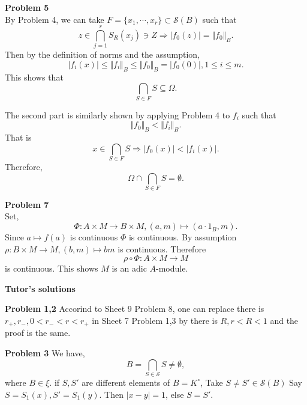 \documentclass[10pt]{article}
\newcommand{\norm}[1]{\Vert #1 \Vert}
\newcommand{\ab}[1]{\vert #1 \vert}
\begin{document}
\par\textbf{Problem 5}\\
By Problem 4, we can take $F=\{x_1,\cdots,x_r\}\subset \mathcal{S}(B)$ such that 
\begin{equation*}
    z\in\bigcap_{j=1}^r S_R(x_j)\ni Z\Rightarrow \ab{f_0(z)}=\norm{f_0}_B.
\end{equation*}
Then by the definition of norms and the assumption,
\begin{equation*}
    \ab{f_i(x)}\leq \norm{f_i}_B\leq \norm{f_0}_B=\ab{f_0(0)}, 1\leq i\leq m.
\end{equation*}
This shows that 
\begin{equation*}
    \bigcap_{S\in F}S\subseteq \Omega.
\end{equation*}
\par The second part is similarly shown by applying Problem 4 to $f_i$ such that 
\begin{equation*}
    \norm{f_0}_B<\norm{f_i}_B.
\end{equation*}
That is 
\begin{equation*}
    x\in\bigcap_{S\in F}S\Rightarrow \ab{f_0(x)}<\ab{f_i(x)}.
\end{equation*}
Therefore,
\begin{equation*}
    \Omega\cap\bigcap_{S\in F}S=\emptyset.
\end{equation*}
\par\textbf{Problem 7}\\
Set,
\begin{equation*}
    \Phi:A\times M\to B\times M, (a,m)\mapsto(a\cdot1_B,m).
\end{equation*}
Since $a\mapsto f(a)$ is continuous $\Phi$ is continuous. By assumption $\rho:B\times M\to M, (b,m)\mapsto bm$ is continuous. Therefore 
\begin{equation*}
    \rho\circ\Phi:A\times M\to M
\end{equation*}
is continuous. This shows $M$ is an adic $A$-module.
\par\textbf{Tutor's solutions}
\par\textbf{Problem 1,2}
Accorind to Sheet 9 Problem 8, one can replace there is $r_+,r_-,0<r_-<r<r_+$ in Sheet 7 Problem 1,3 by there is $R, r<R<1$ and the proof is the same.
\par\textbf{Problem 3}
We have,
\begin{equation*}
    B = \bigcap_{S\in\mathcal{S}}S \not=\emptyset,
\end{equation*}
where $B\in\xi$. if $S,S'$ are different elements of $B=K^\circ$, Take $S\not=S'\in\mathcal{S}(B)$ Say $S=S_1(x),S' = S_1(y)$. Then $\ab{x-y}=1$, else $S=S'$.
\end{document}
